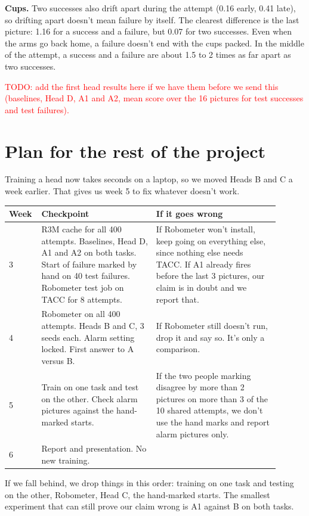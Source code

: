 \documentclass{article}
\begin{document}
\textbf{Cups.} Two successes also drift apart during the attempt (0.16 early, 0.41 late), so drifting apart doesn't mean failure by itself. The clearest difference is the last picture: 1.16 for a success and a failure, but 0.07 for two successes. Even when the arms go back home, a failure doesn't end with the cups packed. In the middle of the attempt, a success and a failure are about 1.5 to 2 times as far apart as two successes.

\textcolor{red}{TODO: add the first head results here if we have them before we send this (baselines, Head D, A1 and A2, mean score over the 16 pictures for test successes and test failures).}

\section{Plan for the rest of the project}\label{sec:plan}
Training a head now takes seconds on a laptop, so we moved Heads B and C a week earlier. That gives us week 5 to fix whatever doesn't work.

\begin{center}
\small
\begin{tabular}{p{0.07\linewidth}p{0.4\linewidth}p{0.43\linewidth}}
\hline
Week & Checkpoint & If it goes wrong \\
\hline
3 & R3M cache for all 400 attempts. Baselines, Head D, A1 and A2 on both tasks. Start of failure marked by hand on 40 test failures. Robometer test job on TACC for 8 attempts. & If Robometer won't install, keep going on everything else, since nothing else needs TACC. If A1 already fires before the last 3 pictures, our claim is in doubt and we report that. \\
4 & Robometer on all 400 attempts. Heads B and C, 3 seeds each. Alarm setting locked. First answer to A versus B. & If Robometer still doesn't run, drop it and say so. It's only a comparison. \\
5 & Train on one task and test on the other. Check alarm pictures against the hand-marked starts. & If the two people marking disagree by more than 2 pictures on more than 3 of the 10 shared attempts, we don't use the hand marks and report alarm pictures only. \\
6 & Report and presentation. No new training. & \\
\hline
\end{tabular}
\end{center}

If we fall behind, we drop things in this order: training on one task and testing on the other, Robometer, Head C, the hand-marked starts. The smallest experiment that can still prove our claim wrong is A1 against B on both tasks.
\end{document}

